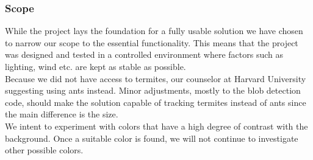 

\subsubsection{Scope} \mbox{}\par



While the project lays the foundation for a fully usable solution we have chosen to narrow our scope to the essential functionality. This means that the project was designed and tested in a controlled environment where factors such as lighting, wind etc. are kept as stable as possible. \\

Because we did not have access to termites, our counselor at Harvard University suggesting using ants instead. Minor adjustments, mostly to the blob detection code, should make the solution capable of tracking termites instead of ants since the main difference is the size. \\

We intent to experiment with colors that have a high degree of contrast with the background. Once a suitable color is found, we will not continue to investigate other possible colors.\\




